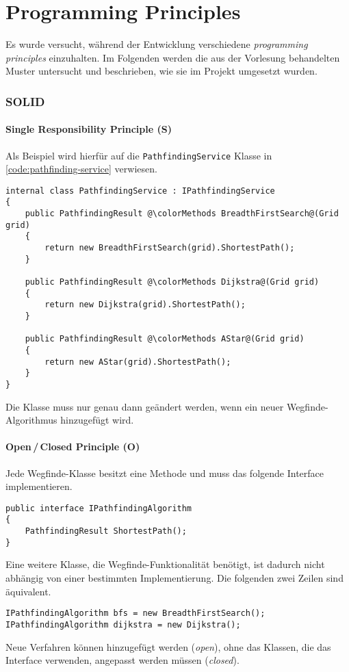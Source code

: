 \part{Programming Principles} \label{part:programming-principles}
Es wurde versucht, während der Entwicklung
verschiedene \textit{programming principles} einzuhalten.
Im Folgenden werden die aus der Vorlesung behandelten Muster untersucht und
beschrieben, wie sie im Projekt umgesetzt wurden.

\section{SOLID}

\subsection{Single Responsibility Principle (S)}
Als Beispiel wird hierfür auf die \lstinline{PathfindingService} Klasse
in \autoref{code:pathfinding-service} verwiesen.
\begin{lstlisting}[caption={\lstinline{PathfindingService} Klasse},
    label={code:pathfinding-service}]
internal class PathfindingService : IPathfindingService
{
    public PathfindingResult @\colorMethods BreadthFirstSearch@(Grid grid)
    {
        return new BreadthFirstSearch(grid).ShortestPath();
    }

    public PathfindingResult @\colorMethods Dijkstra@(Grid grid)
    {
        return new Dijkstra(grid).ShortestPath();
    }

    public PathfindingResult @\colorMethods AStar@(Grid grid)
    {
        return new AStar(grid).ShortestPath();
    }
}
\end{lstlisting}
Die Klasse muss nur genau dann geändert werden,
wenn ein neuer Wegfinde-Algorithmus hinzugefügt wird.

\subsection{Open\,/\,Closed Principle (O)}
Jede Wegfinde-Klasse besitzt eine Methode 
und muss das folgende Interface implementieren.
\begin{lstlisting}[caption={Wegfinde-Algorithmus Interface},label={code:i-pathfinding}]
public interface IPathfindingAlgorithm
{
    PathfindingResult ShortestPath();
}
\end{lstlisting}
Eine weitere Klasse, die Wegfinde-Funktionalität benötigt, ist dadurch nicht abhängig
von einer bestimmten Implementierung. Die folgenden zwei Zeilen sind äquivalent.
\begin{lstlisting}[caption={Abstraktion der Wegfinde-Algorithmen},
label={code:pathfinding-abstracttion}]
IPathfindingAlgorithm bfs = new BreadthFirstSearch();
IPathfindingAlgorithm dijkstra = new Dijkstra();
\end{lstlisting}
Neue Verfahren können hinzugefügt werden (\textit{open}), ohne das Klassen,
die das  Interface verwenden,
angepasst werden müssen (\textit{closed}).

